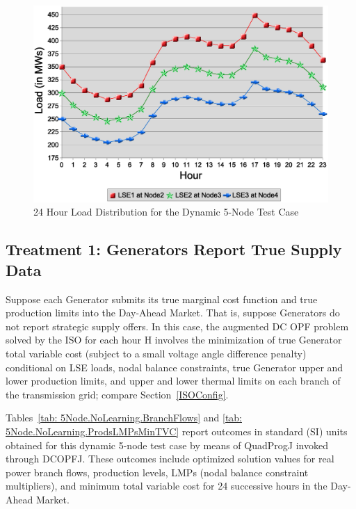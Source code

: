 \documentclass[12pt]{article}
\begin{document}
\begin{figure}
	\centering
		\includegraphics[totalheight = 10cm]{AMES.24HourLoad00-23.eps}
	\caption{24 Hour Load Distribution for the Dynamic 5-Node Test Case}
	\label{fig:24HourLoad.5Node}
\end{figure}


\subsection{Treatment 1: Generators Report True Supply Data \label{5NodeCaseWithNoStrat} }

Suppose each Generator submits its true marginal cost function and true production limits into the Day-Ahead Market.  That is, suppose Generators do not report strategic supply offers. In this case, the augmented DC OPF problem solved by the ISO for each hour H involves the minimization of true Generator total variable cost (subject to a small voltage angle difference penalty) conditional on LSE loads, nodal balance constraints, true Generator upper and lower production limits, and upper and lower thermal limits on each branch of the transmission grid; compare Section~\ref{ISOConfig}.

     Tables~\ref{tab: 5Node.NoLearning.BranchFlows} and \ref{tab: 5Node.NoLearning.ProdsLMPsMinTVC} report outcomes in standard (SI) units obtained for this dynamic 5-node test case by means of QuadProgJ invoked through DCOPFJ.  These outcomes include optimized solution values for real power branch flows, production levels, LMPs (nodal balance constraint multipliers), and minimum total variable cost for 24 successive hours in the Day-Ahead Market.  
\end{document}
